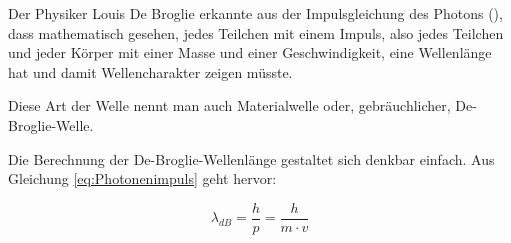 Der Physiker Louis De Broglie erkannte aus der Impulsgleichung des Photons (), dass mathematisch gesehen, jedes Teilchen mit einem Impuls, also jedes Teilchen und jeder Körper mit einer Masse und einer Geschwindigkeit, eine Wellenlänge hat und damit Wellencharakter zeigen müsste.

Diese Art der Welle nennt man auch Materialwelle oder, gebräuchlicher, De-Broglie-Welle.

Die Berechnung der De-Broglie-Wellenlänge gestaltet sich denkbar einfach. Aus Gleichung \ref{eq:Photonenimpuls} geht hervor:

\begin{equation}
	\lambda_{dB} = \frac{h}{p} = \frac{h}{m \cdot v}
\end{equation}